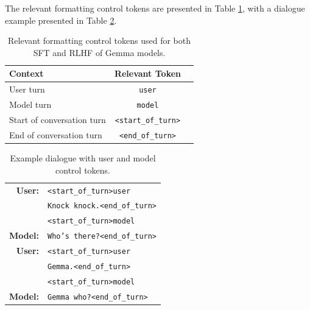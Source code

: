 \documentclass[11pt, a4paper, logo, twocolumn, copyright, nonumbering]{googledeepmind}
\begin{document}
The relevant formatting control tokens are presented in Table \ref{tab:formatting_tokens}, with a dialogue example presented in Table \ref{tab:sample_dialogue}.

\begin{table}[ht!]
    \setlength{\tabcolsep}{6pt}
    \centering
    \footnotesize
    \begin{tabular}{l c c}
    \toprule
    \textbf{Context} & \textbf{Relevant Token} \\
        \midrule
        \scriptsize{User turn} & \texttt{\color{NavyBlue}user} \\
        \midrule
        \scriptsize{Model turn} & \texttt{\color{NavyBlue}model} \\
        \midrule
        \scriptsize{Start of conversation turn} & \texttt{\color{NavyBlue}<start\_of\_turn>} \\
        \midrule
        \scriptsize{End of conversation turn} & \texttt{\color{NavyBlue}<end\_of\_turn>} \\
    \bottomrule
    \end{tabular}
    \caption{Relevant formatting control tokens used for both SFT and RLHF of Gemma models.}
    \label{tab:formatting_tokens}
\end{table}

\begin{table}[ht!]
    \setlength{\tabcolsep}{6pt}
    \centering
    \footnotesize   
    \begin{tabular}{r l}
    \toprule
    \vspace{0.2cm}
    \textbf{User:} & {\color{NavyBlue}\texttt{<start\_of\_turn>user}} \vspace{-0.2cm} \\
    & \texttt{Knock knock.}{\color{NavyBlue}\texttt{<end\_of\_turn>}} \\
    & {\color{NavyBlue}\texttt{<start\_of\_turn>model}} \vspace{0.1cm} \\
    
    \textbf{Model:} & \texttt{Who's there?}{\color{NavyBlue}\texttt{<end\_of\_turn>}} \vspace{0.1cm} \\

    \textbf{User:} & {\color{NavyBlue}\texttt{<start\_of\_turn>user}} \\
    & \texttt{Gemma.}{\color{NavyBlue}\texttt{<end\_of\_turn>}} \\
    & {\color{NavyBlue}\texttt{<start\_of\_turn>model}} \vspace{0.1cm} \\

    \textbf{Model:} & \texttt{Gemma who?}{\color{NavyBlue}\texttt{<end\_of\_turn>}} \vspace{0.1cm} \\

    \bottomrule
    \end{tabular}
    \caption{Example dialogue with user and model control tokens.}
    \label{tab:sample_dialogue}
    \vspace{-0.5cm}
\end{table}
\end{document}
